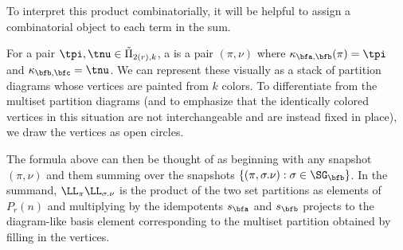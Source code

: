 To interpret this product combinatorially, it will be helpful to assign a combinatorial object to each term in the sum.

\begin{defi}\label{def:snapshot}
    For a pair $\tpi,\tnu\in\tilde\Pi_{2(r),k}$, a  is a pair $(\pi,\nu)$ where $\kappa_{\bfa,\bfb}(\pi)=\tpi$ and $\kappa_{\bfb,\bfc}=\tnu$. We can represent these visually as a stack of partition diagrams whose vertices are painted from $k$ colors. To differentiate from the multiset partition diagrams (and to emphasize that the identically colored vertices in this situation are not interchangeable and are instead fixed in place), we draw the vertices as open circles.
\end{defi}

  The formula above can then be thought of as beginning with any snapshot $(\pi,\nu)$ and them summing over the snapshots $\{(\pi,\sigma.\nu):\sigma\in\SG_\bfb\}$. In the summand, $\LL_\pi\LL_{\sigma.\nu}$ is the product of the two set partitions as elements of $P_r(n)$ and multiplying by the idempotents $s_\bfa$ and $s_\bfb$ projects to the diagram-like basis element corresponding to the multiset partition obtained by filling in the vertices.


